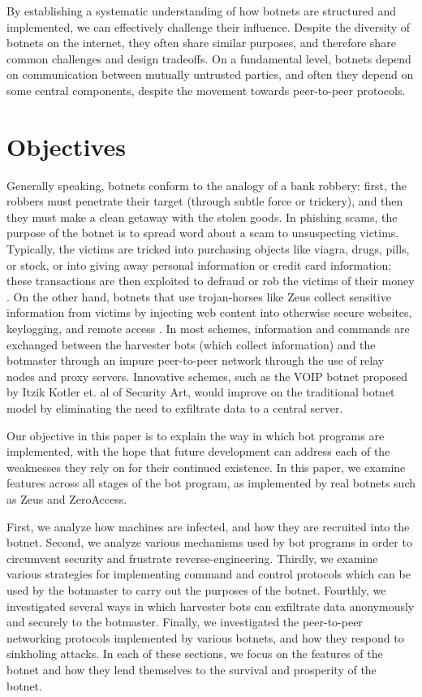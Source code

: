 \documentclass{acm_proc_article-sp}
\begin{document}
By establishing a systematic understanding of how botnets are structured and implemented, we can effectively challenge their influence. Despite the diversity of botnets on the internet, they often share similar purposes, and therefore share common challenges and design tradeoffs.  On a fundamental level, botnets depend on communication between mutually untrusted parties\cite{stone:p2p}, and often they depend on some central components, despite the movement towards peer-to-peer protocols.


\section{Objectives}

Generally speaking, botnets conform to the analogy of a bank robbery: first, the robbers must penetrate their target (through subtle force or trickery), and then they must make a clean getaway with the stolen goods. In phishing scams, the purpose of the botnet is to spread word about a scam to unsuspecting victims. Typically, the victims are tricked into purchasing objects like viagra, drugs, pills, or stock, or into giving away personal information or credit card information; these transactions are then exploited to defraud or rob the victims of their money
\cite{defcon:javascript}
\cite{defcon:spam}
\cite{wikipedia:phishing}.  On the other hand, botnets that use trojan-horses like Zeus collect sensitive information from victims by injecting web content into otherwise secure websites, keylogging, and remote access\cite{defcon:javascript}
\cite{blackhat:zeus}
\cite{defcon:spam}
\cite{wikipedia:trojan}. In most schemes, information and commands are exchanged between the harvester bots (which collect information) and the botmaster through an impure peer-to-peer network through the use of relay nodes and proxy servers. Innovative schemes, such as the VOIP botnet proposed by Itzik Kotler et. al of Security Art, would improve on the traditional botnet model by eliminating the need to exfiltrate data to a central server\cite{defcon:voip}.

Our objective in this paper is to explain the way in which bot programs are implemented, with the hope that future development can address each of the weaknesses they rely on for their continued existence.  In this paper, we examine features across all stages of the bot program, as implemented by real botnets such as Zeus and ZeroAccess.

First, we analyze how machines are infected, and how they are recruited into the botnet. Second, we analyze various mechanisms used by bot programs in order to circumvent security  and frustrate reverse-engineering. Thirdly, we examine various strategies for implementing command and control protocols which can be used by the botmaster to carry out the purposes of the botnet. Fourthly, we investigated several ways in which harvester bots can exfiltrate data anonymously and securely to the botmaster.  Finally, we investigated the peer-to-peer networking protocols implemented by various botnets, and how they respond to sinkholing attacks.  In each of these sections, we focus on the features of the botnet and how they lend themselves to the survival and prosperity of the botnet.
\end{document}

